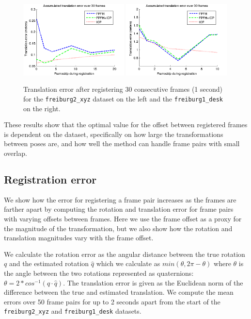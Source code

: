 \documentclass[a4paper]{article}
\begin{document}
\begin{figure}[htbp]
    \centering
        \includegraphics[width=0.49\textwidth]{ims/xyzAccumulatedtranslationerrorover30frames.png}
        \includegraphics[width=0.49\textwidth]{ims/deskAccumulatedtranslationerrorover30frames.png}
    \caption{Translation error after registering 30 consecutive frames (1 second) for the  \texttt{freiburg2\_xyz} dataset on the left and the \texttt{freiburg1\_desk} on the right.}
    \label{fig:accumulated_translation_error}
\end{figure}

These results show that the optimal value for the offset between registered frames is dependent on the dataset, specifically on how large the transformations between poses are, and how well the method can handle frame pairs with small overlap.

\subsection{Registration error}
\label{registration_error}

We show how the error for registering a frame pair increases as the frames are farther apart by computing the rotation and translation error for frame pairs with varying offsets between frames. Here we use the frame offset as a proxy for the magnitude of the transformation, but we also show how the rotation and translation magnitudes vary with the frame offset.

We calculate the rotation error as the angular distance between the true rotation $q$ and the estimated rotation $\hat q$ which we calculate as $min(\theta, 2\pi - \theta)$ where $\theta$ is the angle between the two rotations represented as quaternions: $\theta = 2 * cos^{-1}(q \cdot \hat q)$. %
The translation error is given as the Euclidean norm of the difference between the true and estimated translation. We compute the mean errors over 50 frame pairs for up to 2 seconds apart from the start of the \texttt{freiburg2\_xyz} and \texttt{freiburg1\_desk} datasets.
\end{document}
